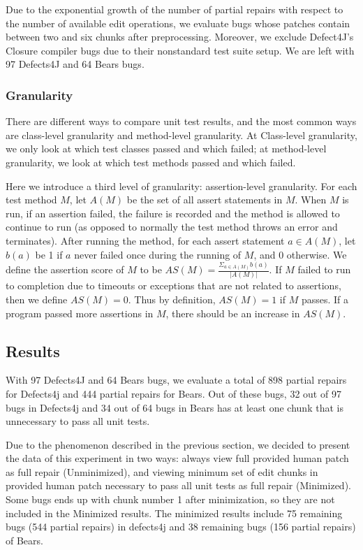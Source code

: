 \documentclass[sigconf, timestamp-false, anonymous=true]{acmart}
\begin{document}
Due to the exponential growth of the number of partial repairs with respect 
to the number of available edit operations, we evaluate bugs whose patches 
contain between two and six chunks after preprocessing.
Moreover, we exclude Defect4J's Closure compiler bugs due to 
their nonstandard test suite setup.
We are left with 97 Defects4J and 64 Bears bugs.

\subsubsection{Granularity}

There are different ways to compare unit test results, and the most common ways 
are class-level granularity and method-level granularity. At Class-level granularity, 
we only look at which test classes passed and which failed; at method-level 
granularity, we look at which test methods passed and which failed.

Here we introduce a third level of granularity: assertion-level granularity. 
For each test method $M$, let $A(M)$ be the set of all assert statements in $M$. 
When $M$ is run, if an assertion failed, the failure is recorded and the method 
is allowed to continue to run (as opposed to normally the test method throws an 
error and terminates). After running the method, for each assert statement 
$a\in A(M)$, let $b(a)$ be 1 if $a$ never failed once during the running of $M$, 
and 0 otherwise. We define the assertion score of $M$ to be 
$AS(M)=\frac{\Sigma_{a\in A(M)}b(a)}{|A(M)|}$. If $M$ failed to run to completion 
due to timeouts or exceptions that are not related to assertions, then we define 
$AS(M)=0$. Thus by definition, $AS(M)=1$ if $M$ passes. If a program passed more 
assertions in $M$, there should be an increase in $AS(M)$.


\subsection{Results}

With 97 Defects4J and 64 Bears bugs, we evaluate
a total of 898 partial repairs for Defects4j and 444 partial repairs for Bears.
Out of these bugs, 32 out of 97 bugs in Defects4j and 
34 out of 64 bugs in Bears has at least one chunk that
is unnecessary to pass all unit tests.

Due to the phenomenon described in the previous section, we decided to present the
data of this experiment in two ways: always view full provided human patch as full repair
(Unminimized), and viewing minimum set of edit chunks in provided human patch necessary
to pass all unit tests as full repair (Minimized).
Some bugs ends up with chunk number 1 after minimization, 
so they are not included in the Minimized results. The minimized results 
include 75 remaining bugs (544 partial repairs) in defects4j and 38 remaining bugs (156 partial repairs) of Bears. 
\end{document}

